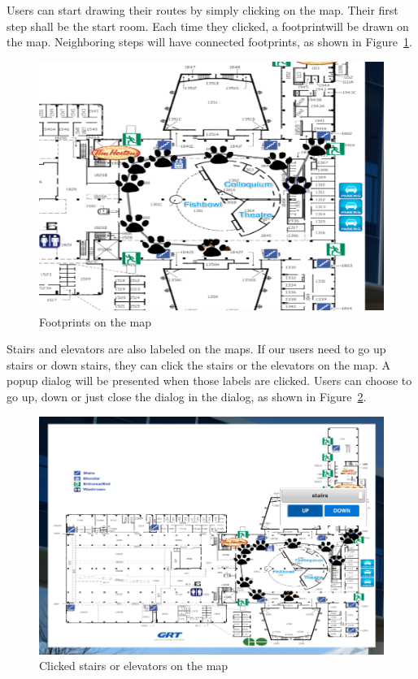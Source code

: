 \documentclass{sigchi}
\begin{document}
Users can start drawing their routes by simply clicking on the map. Their first step shall be the start room. Each time they clicked, a footprintwill be drawn on the map. Neighboring steps will have connected footprints, as shown in Figure~\ref{fig:map1}.

\begin{figure}[!h]
\centering
\includegraphics[width=1.0\columnwidth]{pics/map1.png}
\caption{Footprints on the map}
\label{fig:map1}
\end{figure}


Stairs and elevators are also labeled on the maps. If our users need to go up stairs or down stairs, they can click the stairs or the elevators on the map. A popup dialog will be presented when those labels are clicked. Users can choose to go up, down or just close the dialog in the dialog, as shown in Figure~\ref{fig:map2}.

\begin{figure}[!h]
\centering
\includegraphics[width=1.0\columnwidth]{pics/map2.png}
\caption{Clicked stairs or elevators on the map}
\label{fig:map2}
\end{figure}
\end{document}
